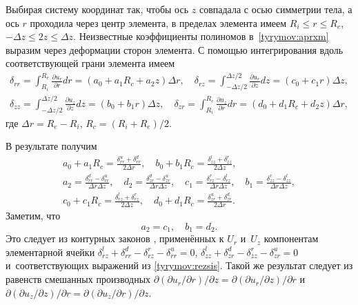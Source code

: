 Выбирая систему координат так, чтобы ось $z$  совпадала с осью
симметрии тела, а ось $r$  проходила через центр элемента, в
пределах элемента имеем $ R_i\leqslant r \leqslant R_e$, $-\Delta z \leqslant 2 z \leqslant \Delta z$. 
Неизвестные коэффициенты полиномов в~\eqref{tyrymov:aprxm} выразим через деформации сторон элемента. С помощью интегрирования вдоль соответствующей грани элемента имеем
$$
\begin{array}{c}
 \displaystyle  \delta_{rr}=\int_{R_i}^{R_e}\frac{\partial u_r}{\partial r} dr=(a_0+a_1R_c+a_2z)\Delta r, \quad
 \delta_{rz}=\int_{-\Delta z/2}^{\Delta z/2}\frac{\partial u_r}{\partial z} dz=(c_0+c_1r)\Delta z,\\[2mm]
 \displaystyle \delta_{zz}=\int_{-\Delta z/2}^{\Delta z/2}\frac{\partial u_z}{\partial z} dz=(b_0+b_1r)\Delta
 z,
  \quad \delta_{zr}=\int_{R_i}^{R_e}\frac{\partial u_z}{\partial r} dr=(d_0+d_1R_c+d_2z)\Delta r, 
\end{array}
$$ 
где $\Delta r=R_e-R_i$, $R_c=(R_i+R_e)/2$.


В результате получим
\begin{equation}\label{tyrymov:rezsis}
    \begin{array}{c}
      \displaystyle a_0+a_1R_c=\frac{\delta_{rr}^u+\delta_{rr}^d}{2\Delta r},\quad
      b_0+b_1R_c=\frac{\delta_{zz}^l+\delta_{zz}^r}{2\Delta z}, \\[2mm]
       \displaystyle a_2=\frac{\delta_{rr}^d-\delta_{rr}^u}{\Delta r\Delta z},\quad
      d_2=\frac{\delta_{zr}^d-\delta_{zr}^u}{\Delta r\Delta z},\quad
      c_1=\frac{\delta_{rz}^r-\delta_{rz}^l}{\Delta r\Delta z},\quad
      b_1=\frac{\delta_{zz}^r-\delta_{zz}^l}{\Delta r\Delta z}, \\[2mm]
       \displaystyle c_0+c_1R_c=\frac{\delta_{rz}^l+\delta_{rz}^r}{2\Delta z},\quad
      d_0+d_1R_c=\frac{\delta_{zr}^u+\delta_{zr}^d}{2\Delta r}. 
         \end{array}
\end{equation}
Заметим, что
\begin{equation}\label{tyrymov:zam}
    a_2=c_1,\quad b_1=d_2.
\end{equation}
Это следует из контурных законов \cite{tyr:bib:6}, применённых к $U_r$ и~$U_z$ компонентам элементарной ячейки
$\delta_{rz}^l+\delta_{rr}^d-\delta_{rz}^r-\delta_{rr}^u=0$,
$\delta_{zz}^l+\delta_{zr}^d-\delta_{zz}^r-\delta_{zr}^u=0 $ и~соответствующих выражений из \eqref{tyrymov:rezsis}. 
Такой же результат следует из равенств смешанных производных $\partial(\partial u_r/\partial r )/\partial z= \partial(\partial u_r/\partial z )/\partial r$ и $\partial(\partial u_z/\partial z )/\partial r=
\partial(\partial u_z/\partial r )/\partial z$.


